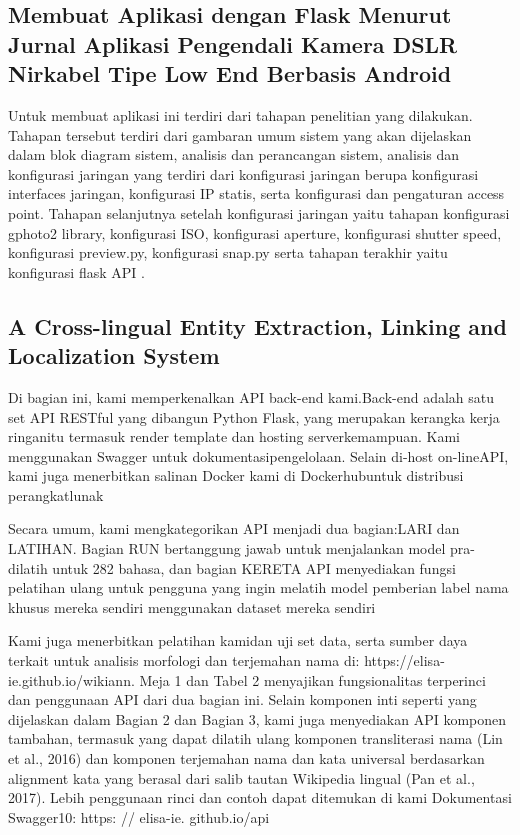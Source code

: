\documentclass[12pt]{article}
\begin{document}
\subsection{Membuat Aplikasi dengan Flask Menurut Jurnal Aplikasi Pengendali Kamera DSLR Nirkabel Tipe Low End Berbasis Android}
Untuk membuat aplikasi ini terdiri dari tahapan penelitian yang dilakukan. Tahapan tersebut terdiri dari gambaran umum sistem yang akan dijelaskan dalam blok diagram sistem, analisis dan perancangan sistem, analisis dan konfigurasi jaringan yang terdiri dari konfigurasi jaringan berupa konfigurasi interfaces jaringan, konfigurasi IP statis, serta konfigurasi dan pengaturan access point. Tahapan selanjutnya setelah konfigurasi jaringan yaitu tahapan konfigurasi gphoto2 library, konfigurasi ISO, konfigurasi aperture, konfigurasi shutter speed, konfigurasi preview.py, konfigurasi snap.py serta tahapan terakhir yaitu konfigurasi flask API \cite{computingaplikasi}.


\subsection{A Cross-lingual Entity Extraction, Linking and Localization System}
Di bagian ini, kami memperkenalkan API back-end kami.Back-end adalah satu set API RESTful yang dibangun Python Flask, yang merupakan kerangka kerja ringanitu termasuk render template dan hosting serverkemampuan. Kami menggunakan Swagger untuk dokumentasipengelolaan. Selain di-host on-lineAPI, kami juga menerbitkan salinan Docker kami di Dockerhubuntuk distribusi perangkatlunak

Secara umum, kami mengkategorikan API menjadi dua bagian:LARI dan LATIHAN. Bagian RUN bertanggung jawab untuk menjalankan model pra-dilatih untuk 282 bahasa, dan bagian KERETA API menyediakan fungsi pelatihan ulang untuk pengguna yang ingin melatih model pemberian label nama khusus mereka sendiri menggunakan dataset mereka sendiri

Kami juga menerbitkan pelatihan kamidan uji set data, serta sumber daya terkait untuk analisis morfologi dan terjemahan nama di: https://elisa-ie.github.io/wikiann. Meja 1 dan Tabel 2 menyajikan fungsionalitas terperinci dan penggunaan API dari dua bagian ini. Selain komponen inti seperti yang dijelaskan dalam Bagian 2 dan Bagian 3, kami juga menyediakan API komponen tambahan, termasuk yang dapat dilatih ulang komponen transliterasi nama (Lin et al., 2016) dan komponen terjemahan nama dan kata universal berdasarkan alignment kata yang berasal dari salib tautan Wikipedia lingual (Pan et al., 2017). Lebih penggunaan rinci dan contoh dapat ditemukan di kami Dokumentasi Swagger10: https: // elisa-ie. github.io/api 
\end{document}
